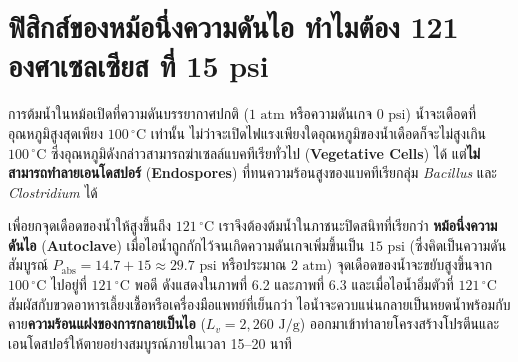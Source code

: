 \section{ฟิสิกส์ของหม้อนึ่งความดันไอ ทำไมต้อง 121 องศาเซลเซียส ที่ 15 psi}


การต้มน้ำในหม้อเปิดที่ความดันบรรยากาศปกติ ($1\text{ atm}$ หรือความดันเกจ $0\text{ psi}$) น้ำจะเดือดที่อุณหภูมิสูงสุดเพียง $100\,^\circ\text{C}$ เท่านั้น ไม่ว่าจะเปิดไฟแรงเพียงใดอุณหภูมิของน้ำเดือดก็จะไม่สูงเกิน $100\,^\circ\text{C}$ ซึ่งอุณหภูมิดังกล่าวสามารถฆ่าเซลล์แบคทีเรียทั่วไป (\textbf{Vegetative Cells}) ได้ แต่\textbf{ไม่สามารถทำลายเอนโดสปอร์} (\textbf{Endospores}) ที่ทนความร้อนสูงของแบคทีเรียกลุ่ม \textit{Bacillus} และ \textit{Clostridium} ได้

เพื่อยกจุดเดือดของน้ำให้สูงขึ้นถึง $121\,^\circ\text{C}$ เราจึงต้องต้มน้ำในภาชนะปิดสนิทที่เรียกว่า \textbf{หม้อนึ่งความดันไอ} (\textbf{Autoclave}) เมื่อไอน้ำถูกกักไว้จนเกิดความดันเกจเพิ่มขึ้นเป็น $15\text{ psi}$ (ซึ่งคิดเป็นความดันสัมบูรณ์ $P_{\text{abs}} = 14.7 + 15 \approx 29.7\text{ psi}$ หรือประมาณ $2\text{ atm}$) จุดเดือดของน้ำจะขยับสูงขึ้นจาก $100\,^\circ\text{C}$ ไปอยู่ที่ $121\,^\circ\text{C}$ พอดี ดังแสดงใน\mbox{ภาพที่} 6.2 และ\mbox{ภาพที่} 6.3 และเมื่อไอน้ำอิ่มตัวที่ $121\,^\circ\text{C}$ สัมผัสกับขวดอาหารเลี้ยงเชื้อหรือเครื่องมือแพทย์ที่เย็นกว่า ไอน้ำจะควบแน่นกลายเป็นหยดน้ำพร้อมกับคาย\textbf{ความร้อนแฝงของการกลายเป็นไอ} ($L_v = 2{,}260\text{ J/g}$) ออกมาเข้าทำลายโครงสร้างโปรตีนและเอนโดสปอร์ให้ตายอย่างสมบูรณ์ภายในเวลา 15--20 นาที

